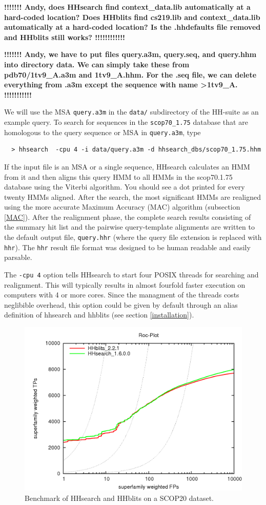 \documentclass[11pt,a4paper]{article}
\begin{document}
{\bf !!!!!!! Andy, does HHsearch find context\_data.lib automatically at a hard-coded location? Does HHblits find cs219.lib and context\_data.lib automatically at a hard-coded location? Is the .hhdefaults file removed and HHblits still works? !!!!!!!!!!!!}

{\bf !!!!!!! Andy, we have to put files query.a3m, query.seq, and query.hhm into directory data. We can simply take these from pdb70/1tv9\_A.a3m and 1tv9\_A.hhm. For the .seq file, we can delete everything from .a3m except the sequence with name >1tv9\_A. !!!!!!!!!!!}

We will use the MSA \verb`query.a3m` in the \verb`data/` subdirectory of the HH-suite as an example query. To search for sequences in the \verb`scop70_1.75` database that are homologous to the query sequence or MSA in \verb`query.a3m`, type

\begin{verbatim}
  > hhsearch  -cpu 4 -i data/query.a3m -d hhsearch_dbs/scop70_1.75.hhm
\end{verbatim}

If the input file is an MSA or a single sequence, HHsearch calculates an HMM from it
and then aligns this query HMM to all 
HMMs in the scop70.1.75 database using the Viterbi algorithm. 
You should see a dot printed for every twenty HMMs aligned. After the search, 
the most significant HMMs are realigned using the more accurate Maximum Accuracy (MAC) 
algorithm (subsection \ref{MAC}). After the realignment phase, the complete search results consisting of the 
summary hit list and the pairwise query-template alignments are written to the default 
output file, \verb`query.hhr` (where the query file extension is replaced with \verb`hhr`). 
The \verb`hhr` result file format was designed to be human readable and easily parsable.

The \verb`-cpu 4` option tells HHsearch to start four POSIX threads for searching and realignment. This will typically results in almost fourfold faster execution on computers with 4 or more cores. Since the managment of the threads costs neglibible overhead, this option could be given by default through an alias definition of hhsearch and hhblits (see section \ref{installation}). 

\begin{figure}[h]
\begin{center}
\includegraphics[width=0.5 \textwidth]{hhblits-hhsearch.png}
\caption{Benchmark of HHsearch and HHblits on a SCOP20 dataset.}
\label{fig:hhsearch_hhblits_bench}
\end{center}
\end{figure}
\end{document}
